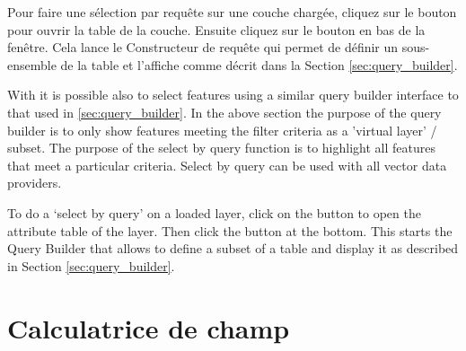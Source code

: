 Pour faire une sélection par requête sur une couche chargée, cliquez sur le bouton\\  pour ouvrir la table de la couche. Ensuite cliquez sur le bouton  en bas de la fenêtre. Cela lance le Constructeur de requête qui permet de définir un sous-ensemble de la table et l'affiche comme décrit dans la Section \ref{sec:query_builder}.

\label{sec:select_by_query}

With \qg it is possible also to select features using a similar query builder
interface to that used in \ref{sec:query_builder}. In the above section
the purpose of the query builder is to only show features meeting the
filter criteria as a 'virtual layer' / subset. The purpose of the select by
query function is to highlight all features that meet a particular criteria.
Select by query can be used with all vector data providers.

To do a `select by query' on a loaded layer, click on the
button  to open the attribute table of the layer. Then
click the  button at the bottom. This starts the Query Builder
that allows to define a subset of a table and display it as described in Section
\ref{sec:query_builder}.

\section{Calculatrice de champ}\label{sec:field_calculator}

